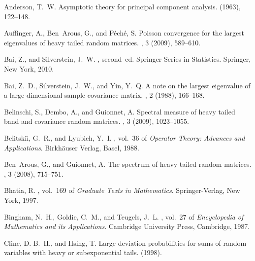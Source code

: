 \documentclass[11pt,reqno]{amsart}
\newcommand{\1}{\mathbf{1}}
\newcommand{\0}{\boldsymbol{0}}
\newcommand{\4}{\mathchoice{\mskip1.5mu}{\mskip1.5mu}{}{}}
\newcommand{\5}{\mathchoice{\mskip-1.5mu}{\mskip-1.5mu}{}{}}
\newcommand{\2}{\penalty250\mskip\thickmuskip\mskip-\thinmuskip} %
\begin{document}
%
\begin{thebibliography}{10}

{\sc Anderson, T.~W.}
\newblock Asymptotic theory for principal component analysis.
 (1963), 122--148.

{\sc Auffinger, A., Ben~Arous, G., and P{\'e}ch{\'e}, S.}
\newblock Poisson convergence for the largest eigenvalues of heavy tailed
  random matrices.
, 3 (2009),
  589--610.

{\sc Bai, Z., and Silverstein, J.~W.}
,
  second~ed.
\newblock Springer Series in Statistics. Springer, New York, 2010.

{\sc Bai, Z.~D., Silverstein, J.~W., and Yin, Y.~Q.}
\newblock A note on the largest eigenvalue of a large-dimensional sample
  covariance matrix.
, 2 (1988), 166--168.

{\sc Belinschi, S., Dembo, A., and Guionnet, A.}
\newblock Spectral measure of heavy tailed band and covariance random matrices.
, 3 (2009), 1023--1055.

{\sc Belitski{\u\i}, G.~R., and Lyubich, Y.~I.}
, vol.~36 of {\em Operator
  Theory: Advances and Applications}.
\newblock Birkh\"auser Verlag, Basel, 1988.

{\sc Ben~Arous, G., and Guionnet, A.}
\newblock The spectrum of heavy tailed random matrices.
, 3 (2008), 715--751.

{\sc Bhatia, R.}
, vol.~169 of {\em Graduate Texts in
  Mathematics}.
\newblock Springer-Verlag, New York, 1997.

{\sc Bingham, N.~H., Goldie, C.~M., and Teugels, J.~L.}
, vol.~27 of {\em Encyclopedia of Mathematics
  and its Applications}.
\newblock Cambridge University Press, Cambridge, 1987.

{\sc Cline, D. B.~H., and Hsing, T.}
\newblock Large deviation probabilities for sums of random variables with heavy
  or subexponential tails.
  (1998).


\end{thebibliography}
\end{document}
